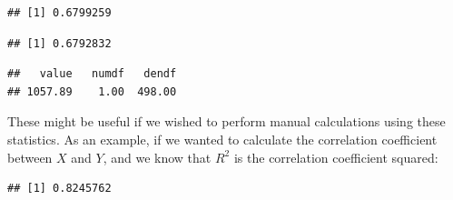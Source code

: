 \documentclass[]{book}
\newenvironment{Shaded}{\begin{snugshade}}{\end{snugshade}}
\newcommand{\KeywordTok}[1]{\textcolor[rgb]{0.13,0.29,0.53}{\textbf{#1}}}
\newcommand{\CommentTok}[1]{\textcolor[rgb]{0.56,0.35,0.01}{\textit{#1}}}
\newcommand{\OperatorTok}[1]{\textcolor[rgb]{0.81,0.36,0.00}{\textbf{#1}}}
\newcommand{\NormalTok}[1]{#1}
\theoremstyle{definition}
\theoremstyle{definition}
\theoremstyle{definition}
\theoremstyle{remark}
\begin{document}
\begin{verbatim}
## [1] 0.6799259
\end{verbatim}

\begin{Shaded}
\end{Shaded}

\begin{verbatim}
## [1] 0.6792832
\end{verbatim}

\begin{Shaded}
\end{Shaded}

\begin{verbatim}
##   value   numdf   dendf 
## 1057.89    1.00  498.00
\end{verbatim}

These might be useful if we wished to perform manual calculations using
these statistics. As an example, if we wanted to calculate the
correlation coefficient between \(X\) and \(Y\), and we know that
\(R^2\) is the correlation coefficient squared:

\begin{Shaded}
\end{Shaded}

\begin{verbatim}
## [1] 0.8245762
\end{verbatim}

\begin{Shaded}
\end{Shaded}
\end{document}
